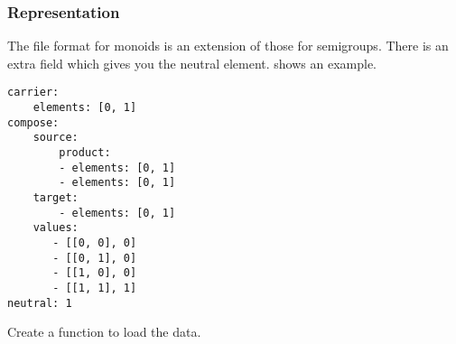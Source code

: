 





\subsubsection*{Representation}
%

The file format for monoids is an extension of those for semigroups.
There is an extra field  which gives you the neutral element.
 shows an example.

\begin{longcode}
  \caption{}
  \label{lst:monoid1}
  \begin{verbatim}
carrier:
    elements: [0, 1]
compose:
    source:
        product:
        - elements: [0, 1]
        - elements: [0, 1]
    target:
        - elements: [0, 1]
    values:
       - [[0, 0], 0]
       - [[0, 1], 0]
       - [[1, 0], 0]
       - [[1, 1], 1]
neutral: 1
  \end{verbatim}
\end{longcode}



\begin{gradedexercise}
  Create a function to load the data.
%
\end{gradedexercise}


